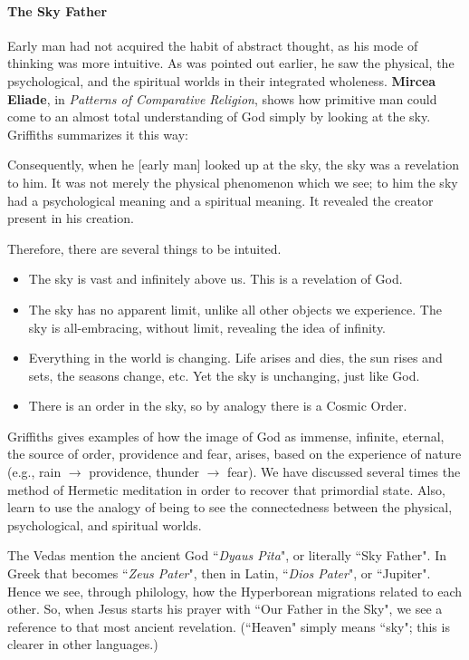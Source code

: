 \paragraph{The Sky Father}
Early man had not acquired the habit of abstract thought, as his mode of thinking was more intuitive. As was pointed out earlier, he saw the physical, the psychological, and the spiritual worlds in their integrated wholeness. \textbf{Mircea Eliade}, in \emph{Patterns of Comparative Religion}, shows how primitive man could come to an almost total understanding of God simply by looking at the sky. Griffiths summarizes it this way:

\begin{quotex}
Consequently, when he [early man] looked up at the sky, the sky was a revelation to him. It was not merely the physical phenomenon which we see; to him the sky had a psychological meaning and a spiritual meaning. It revealed the creator present in his creation. 

\end{quotex}
Therefore, there are several things to be intuited.

\begin{itemize}
\item The sky is vast and infinitely above us. This is a revelation of God. 
\item The sky has no apparent limit, unlike all other objects we experience. The sky is all-embracing, without limit, revealing the idea of infinity. 
\item Everything in the world is changing. Life arises and dies, the sun rises and sets, the seasons change, etc. Yet the sky is unchanging, just like God. 
\item There is an order in the sky, so by analogy there is a Cosmic Order. 
\end{itemize}
Griffiths gives examples of how the image of God as immense, infinite, eternal, the source of order, providence and fear, arises, based on the experience of nature (e.g., rain $\rightarrow$ providence, thunder $\rightarrow$ fear). We have discussed several times the method of Hermetic meditation in order to recover that primordial state. Also, learn to use the analogy of being to see the connectedness between the physical, psychological, and spiritual worlds.

The Vedas mention the ancient God ``\emph{Dyaus Pita}", or literally ``Sky Father". In Greek that becomes ``\emph{Zeus Pater}", then in Latin, ``\emph{Dios Pater}", or ``Jupiter". Hence we see, through philology, how the Hyperborean migrations related to each other. So, when Jesus starts his prayer with ``Our Father in the Sky", we see a reference to that most ancient revelation. (``Heaven" simply means ``sky"; this is clearer in other languages.)

